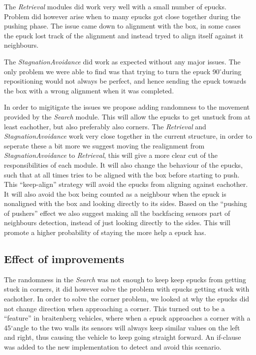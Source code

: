 \documentclass[12pt]{article}
\newcommand{\shiftline}[0]{\hfill\newline\noindent}
\newcommand{\degree}[0]{\ensuremath{^\circ}}
\begin{document}
			\shiftline The \textit{Retrieval} modules did work very well with a small number of epucks. Problem did however arise when to many epucks got close together during
			the pushing phase. The issue came down to alignment with the box, in some cases the epuck lost track of the alignment and instead tryed to align itself against it neighbours. 
			
			\shiftline The \textit{StagnationAvoidance} did work as expected without any major issues. The only problem we were able to find was that trying to turn the
			epuck 90\degree during repositioning would not always be perfect, and hence sending the epuck towards the box with a wrong alignment when it was completed. 
			
			\shiftline In order to migitigate the issues we propose adding randomness to the movement provided by the \textit{Search} module. This will allow the epucks to get 
			unstuck from at least eachother, but also preferably also corners. The \textit{Retrieval} and \textit{StagnationAvoidance} work very close together in the current
			structure, in order to seperate these a bit more we suggest moving the realignment from \textit{StagnationAvoidance} to \textit{Retrieval}, this will give a more 
			clear cut of the responsibilities of each module. It will also change the behaviour of the epucks, such that at all times tries to be aligned with the box
			before starting to push. This "`keep-align"' strategy will avoid the epucks from aligning against eachother. It will also avoid the box being counted as a 
			neighbour when the epuck is nonaligned with the box and looking directly to its sides.
			Based on the "`pushing of pushers"' effect we also suggest making all the backfacing sensors part of neighbours detection, instead of just looking directly
			to the sides. This will promote a higher probability of staying the more help a epuck has.
		
	\subsection{Effect of improvements}
		The randomness in the \textit{Search} was not enough to keep keep epucks from getting stuck in corners, it did however solve the problem with epucks getting stuck with eachother.
		In order to solve the corner problem, we looked at why the epucks did not change direction when approaching a corner. This turned out to be a "`feature"' in braitenberg vehicles, 
		where when a epuck approaches a corner with a 45\degree angle to the two walls its sensors will always keep similar values on the left and right, thus causing the vehicle 
		to keep going straight forward. An if-clause was added to the new implementation to detect and avoid this scenario. 
		
\end{document}
